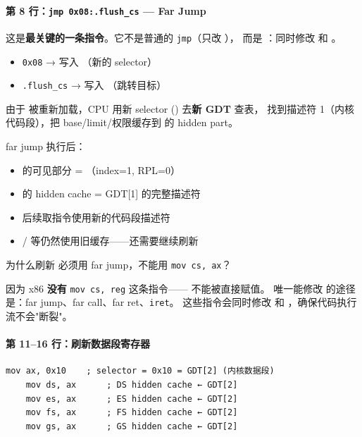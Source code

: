 \paragraph{第 8 行：\texttt{jmp 0x08:.flush\_cs} — Far Jump}

这是\textbf{最关键的一条指令}。它不是普通的 \texttt{jmp}（只改 ），
而是 ：同时修改  和 。

\begin{itemize}
  \item \texttt{0x08} → 写入 （新的 selector）
  \item \texttt{.flush\_cs} → 写入 （跳转目标）
\end{itemize}

由于  被重新加载，CPU 用新 selector () 去\textbf{新 GDT} 查表，
找到描述符 1（内核代码段），把 base/limit/权限缓存到  的 hidden part。

\begin{cpustate}
far jump 执行后：
\begin{itemize}
  \item {} 的可见部分 = （index=1, RPL=0）
  \item {} 的 hidden cache = GDT[1] 的完整描述符
  \item 后续取指令使用新的代码段描述符
  \item {}/ 等仍然使用旧缓存——还需要继续刷新
\end{itemize}
\end{cpustate}

\begin{whybox}
为什么刷新  必须用 far jump，不能用 \texttt{mov cs, ax}？

因为 x86 \textbf{没有} \texttt{mov cs, reg} 这条指令—— 不能被直接赋值。
唯一能修改  的途径是：far jump、far call、far ret、\texttt{iret}。
这些指令会同时修改  和 ，确保代码执行流不会"断裂"。
\end{whybox}

\paragraph{第 11--16 行：刷新数据段寄存器}

\begin{lstlisting}[style=nasmstyle]
    mov ax, 0x10    ; selector = 0x10 = GDT[2] (内核数据段)
    mov ds, ax      ; DS hidden cache ← GDT[2]
    mov es, ax      ; ES hidden cache ← GDT[2]
    mov fs, ax      ; FS hidden cache ← GDT[2]
    mov gs, ax      ; GS hidden cache ← GDT[2]
\end{lstlisting}

